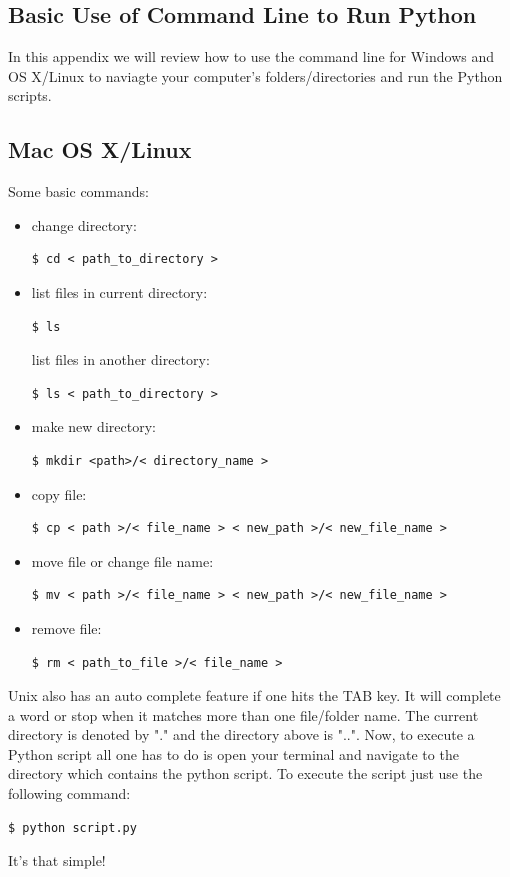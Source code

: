 \documentclass{SciPost}
\newcommand\0{\scalebox{-1}[1]{0}}
\let\svttfamily\ttfamily
\renewcommand\ttfamily{\svttfamily\catcode`0=\active }
\begin{document}
\begin{appendix}
\section{Basic Use of Command Line to Run Python}
\label{app:cmd_line}

In this appendix we will review how to use the command line for Windows and OS X/Linux to naviagte your computer's folders/directories and run the Python scripts.

\subsection{Mac OS X/Linux}
Some basic commands:

\begin{itemize}
	\item change directory:
	\begin{lstlisting}[numbers=none,keywordstyle=\ttfamily]
	$ cd < path_to_directory >
	\end{lstlisting}
	\item list files in current directory:
	\begin{lstlisting}[numbers=none,keywordstyle=\ttfamily]
	$ ls 
	\end{lstlisting}
	list files in another directory:
	\begin{lstlisting}[numbers=none,keywordstyle=\ttfamily]
	$ ls < path_to_directory >
	\end{lstlisting}
	\item make new directory:
	\begin{lstlisting}[numbers=none,keywordstyle=\ttfamily]
	$ mkdir <path>/< directory_name >
	\end{lstlisting}
	\item copy file:
	\begin{lstlisting}[numbers=none,keywordstyle=\ttfamily]
	$ cp < path >/< file_name > < new_path >/< new_file_name >
	\end{lstlisting}
	\item move file or change file name:
	\begin{lstlisting}[numbers=none]
	$ mv < path >/< file_name > < new_path >/< new_file_name >
	\end{lstlisting}
	\item remove file:
	\begin{lstlisting}[numbers=none,keywordstyle=\ttfamily]
	$ rm < path_to_file >/< file_name >
	\end{lstlisting}
	
\end{itemize}
Unix also has an auto complete feature if one hits the TAB key. It will complete a word or stop when it matches more than one file/folder name. The current directory is denoted by "." and the directory above is "..".
%
Now, to execute a Python script all one has to do is open your terminal and navigate to the directory which contains the python script. To execute the script just use the following command:
\begin{lstlisting}[numbers=none,keywordstyle=\ttfamily]
$ python script.py
\end{lstlisting}
It's that simple!


\end{appendix}
\end{document}
